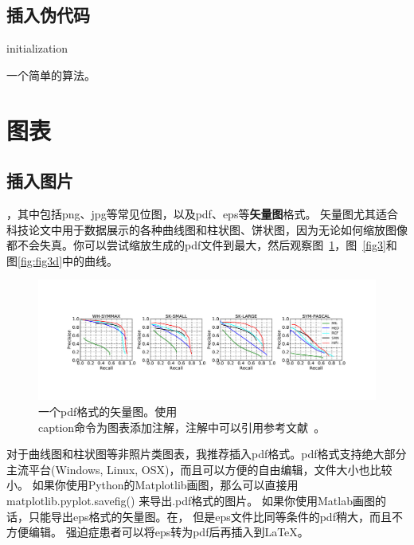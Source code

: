 \documentclass[UTF8]{ctexart}
\numberwithin{equation}{section} %
\numberwithin{table}{section} %
\begin{document}
\subsection{插入伪代码}
\begin{algorithm}[H]
\SetAlgoLined
{}
 initialization\;
 \caption{一个简单的算法。}
\end{algorithm}
\section{图表}
\subsection{插入图片}
，其中包括png、jpg等常见位图，以及pdf、eps等\textbf{矢量图}格式。
矢量图尤其适合科技论文中用于数据展示的各种曲线图和柱状图、饼状图，因为无论如何缩放图像都不会失真。你可以尝试缩放生成的pdf文件到最大，然后观察图~\ref{fig1}，图~\ref{fig3}和图\ref{fig:fig3d}中的曲线。

\begin{figure}[!h]
\includegraphics[width=1\linewidth]{figures/pr-curve}
\caption{一个pdf格式的矢量图。使用\\caption命令为图表添加注解，注解中可以引用参考文献~\cite{shen2017label}。}\label{fig1}
\end{figure}

对于曲线图和柱状图等非照片类图表，我推荐插入pdf格式。pdf格式支持绝大部分主流平台(Windows, Linux, OSX)，而且可以方便的自由编辑，文件大小也比较小。
如果你使用Python的Matplotlib画图，那么可以直接用matplotlib.pyplot.savefig()
来导出.pdf格式的图片。
如果你使用Matlab画图的话，只能导出eps格式的矢量图。在，
但是eps文件比同等条件的pdf稍大，而且不方便编辑。
强迫症患者可以将eps转为pdf后再插入到\LaTeX。
\end{document}
